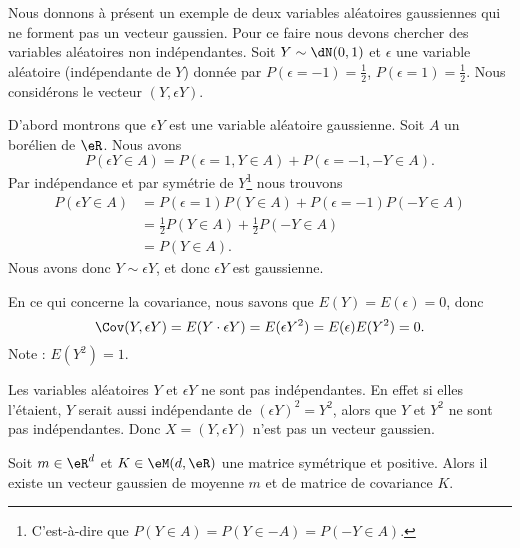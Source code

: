 \begin{example}
	Nous donnons à présent un exemple de deux variables aléatoires gaussiennes qui ne forment pas un vecteur gaussien. Pour ce faire nous devons chercher des variables aléatoires non indépendantes. Soit \( Y\sim \dN(0,1)\) et \( \epsilon\) une variable aléatoire (indépendante de \( Y\)) donnée par \( P(\epsilon=-1)=\frac{ 1 }{2}\), \( P(\epsilon=1)=\frac{ 1 }{2}\). Nous considérons le vecteur \( (Y,\epsilon Y)\).

	D'abord montrons que \( \epsilon Y\) est une variable aléatoire gaussienne. Soit \( A\) un borélien de \( \eR\). Nous avons
	\begin{equation}
		P(\epsilon Y\in A)=P(\epsilon=1,Y\in A)+P(\epsilon=-1,-Y\in A).
	\end{equation}
	Par indépendance et par symétrie de \( Y\)\footnote{C'est-à-dire que \( P(Y\in A)=P(Y\in -A)=P(-Y\in A)\).} nous trouvons
	\begin{subequations}
		\begin{align}
			P(\epsilon Y\in A) & =P(\epsilon=1)P(Y\in A)+P(\epsilon=-1)P(-Y\in A) \\
			                   & =\frac{ 1 }{2}P(Y\in A)+\frac{ 1 }{2}P(-Y\in A)  \\
			                   & =P(Y\in A).
		\end{align}
	\end{subequations}
	Nous avons donc \( Y\sim \epsilon Y\), et donc \( \epsilon Y\) est gaussienne.

	En ce qui concerne la covariance, nous savons que \( E(Y)=E(\epsilon)=0\), donc
	\begin{equation}
		\Cov(Y,\epsilon Y)=E(Y\cdot \epsilon Y)=E(\epsilon Y^2)=E(\epsilon)E(Y^2)=0.
	\end{equation}
	Note : \( E(Y^2)=1\).

	Les variables aléatoires \( Y\) et \( \epsilon Y\) ne sont pas indépendantes. En effet si elles l'étaient, \( Y\) serait aussi indépendante de \( (\epsilon Y)^2=Y^2\), alors que \( Y\) et \( Y^2\) ne sont pas indépendantes. Donc \( X=(Y,\epsilon Y)\) n'est pas un vecteur gaussien.
\end{example}

\begin{theorem}		\label{THOooLRZNooFXWwqy}
	Soit \( m\in \eR^d\) et \( K\in \eM(d,\eR)\) une matrice symétrique et positive. Alors il existe un vecteur gaussien de moyenne \( m\) et de matrice de covariance \( K\).
\end{theorem}

